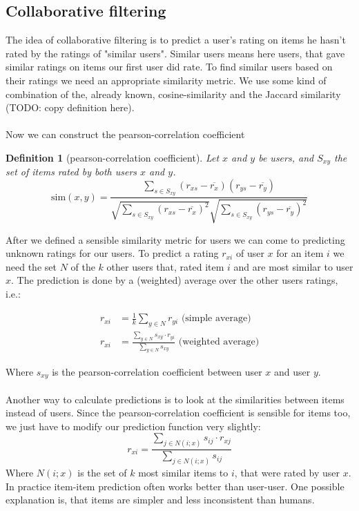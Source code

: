 \documentclass[]{article}
\newtheorem{defi}{Definition}
\begin{document}
\subsection{Collaborative filtering}
The idea of collaborative filtering is to predict a user's rating on items he hasn't rated by the ratings of "similar users". Similar users means here users, that gave similar ratings on items our first user did rate. To find similar users based on their ratings we need an appropriate similarity metric. We use some kind of combination of the, already known, cosine-similarity and the Jaccard similarity (TODO: copy definition here).
\\\\
Now we can construct the pearson-correlation coefficient
\begin{defi}[pearson-correlation coefficient]
Let $x$ and $y$ be users, and $S_{xy}$ the set of items rated by both users $x$ and $y$.
\[
\text{sim}(x,y) = \frac{\sum_{s\in S_{xy}}(r_{xs} - \overline{r_x})(r_{ys} - \overline{r_y})}{\sqrt{\sum_{s\in S_{xy}}(r_{xs} - \overline{r_x})^2}\sqrt{\sum_{s\in S_{xy}}(r_{ys} - \overline{r_y})^2}}
\]
\end{defi}
After we defined a sensible similarity metric for users we can come to predicting unknown ratings for our users. To predict a rating $r_{xi}$ of user $x$ for an item $i$ we need the set $N$ of the $k$ other users that, rated item $i$ and are most similar to user $x$. The prediction is done by a (weighted) average over the other users ratings, i.e.:

\begin{align}
r_{xi} &= \frac{1}{k}\sum_{y \in N} r_{yi} \text{ (simple average)} \\ 
r_{xi} &= \frac{\sum_{y \in N} s_{xy} \cdot r_{yi}}{\sum_{y \in N} s_{xy}} \text{ (weighted average)}
\end{align}

Where $s_{xy}$ is the pearson-correlation coefficient between user $x$ and user $y$. \\\\

Another way to calculate predictions is to look at the similarities between items instead of users. Since the pearson-correlation coefficient is sensible for items too, we just have to modify our prediction function very slightly:
\[
	r_{xi} = \frac{\sum_{j \in N(i;x)} s_{ij} \cdot r_{xj}}{\sum_{j \in N(i;x)} s_{ij}}
\]
Where $N(i;x)$ is the set of $k$ most similar items to $i$, that were rated by user $x$. In practice item-item prediction often works better than user-user. One possible explanation is, that items are simpler and less inconsistent than humans.\\\\
\end{document}
